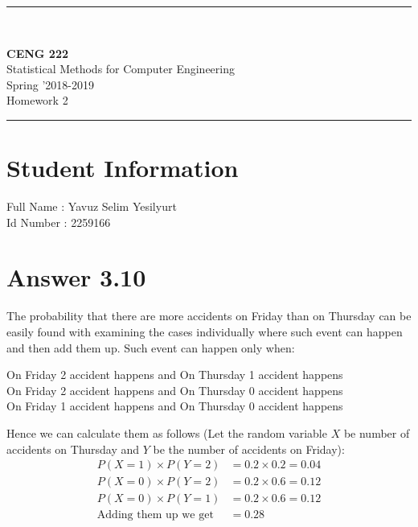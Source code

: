 \documentclass[12pt]{article}
\newcommand{\HRule}{\rule{\linewidth}{1mm}}
\begin{document}
\noindent
\HRule \\[3mm]
\begin{flushright}

                                         \LARGE \textbf{CENG 222}  \\[4mm]
                                         \Large Statistical Methods for Computer Engineering \\[4mm]
                                        \normalsize      Spring '2018-2019 \\
                                           \Large   Homework 2 \\
\end{flushright}
\HRule

\section*{Student Information }
Full Name : Yavuz Selim Yesilyurt \\
Id Number : 2259166 

\section*{Answer 3.10}
The probability that there are more accidents on Friday than on Thursday can be easily found with examining the cases individually where such event can happen and then add them up. Such event can happen only when: 
\begin{center}
On Friday 2 accident happens and On Thursday 1 accident happens \\
On Friday 2 accident happens and On Thursday 0 accident happens \\
On Friday 1 accident happens and On Thursday 0 accident happens 
\end{center}
Hence we can calculate them as follows (Let the random variable $X$ be number of accidents on Thursday and $Y$ be the number of accidents on Friday):
\begin{align*}
P(X=1) \times P(Y=2) &= 0.2 \times 0.2 = 0.04 \\
P(X=0) \times P(Y=2) &= 0.2 \times 0.6 = 0.12 \\
P(X=0) \times P(Y=1) &= 0.2 \times 0.6 = 0.12 \\
\text{Adding them up we get} &= 0.28
\end{align*}
\end{document}
